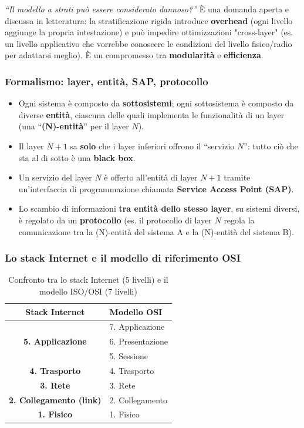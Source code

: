 \documentclass[12pt, a4paper]{article}
\begin{document}
\begin{tcolorbox}[colback=cyan!5, colframe=blue!40!black, title=\textbf{Spunto per l'orale}]
\textit{``Il modello a strati può essere considerato dannoso?''} È una domanda aperta e discussa in letteratura: la stratificazione rigida introduce \textbf{overhead} (ogni livello aggiunge la propria intestazione) e può impedire ottimizzazioni "cross-layer" (es. un livello applicativo che vorrebbe conoscere le condizioni del livello fisico/radio per adattarsi meglio). È un compromesso tra \textbf{modularità} e \textbf{efficienza}.
\end{tcolorbox}

\subsubsection{Formalismo: layer, entità, SAP, protocollo}

\begin{itemize}
    \item Ogni sistema è composto da \textbf{sottosistemi}; ogni sottosistema è composto da diverse \textbf{entità}, ciascuna delle quali implementa le funzionalità di un layer (una ``\textbf{(N)-entità}'' per il layer $N$).
    \item Il layer $N+1$ sa \textbf{solo} che i layer inferiori offrono il ``servizio $N$'': tutto ciò che sta al di sotto è una \textbf{black box}.
    \item Un servizio del layer $N$ è offerto all'entità di layer $N{+}1$ tramite un'interfaccia di programmazione chiamata \textbf{Service Access Point (SAP)}.
    \item Lo scambio di informazioni \textbf{tra entità dello stesso layer}, su sistemi diversi, è regolato da un \textbf{protocollo} (es. il protocollo di layer $N$ regola la comunicazione tra la (N)-entità del sistema A e la (N)-entità del sistema B).
\end{itemize}

\subsubsection{Lo stack Internet e il modello di riferimento OSI}

\begin{table}[H]
\centering
\caption{Confronto tra lo stack Internet (5 livelli) e il modello ISO/OSI (7 livelli)}
\begin{tabular}{cl}
\toprule
\textbf{Stack Internet} & \textbf{Modello OSI} \\
\midrule
 & 7. Applicazione \\
\textbf{5. Applicazione} & 6. Presentazione \\
 & 5. Sessione \\
\textbf{4. Trasporto} & 4. Trasporto \\
\textbf{3. Rete} & 3. Rete \\
\textbf{2. Collegamento (link)} & 2. Collegamento \\
\textbf{1. Fisico} & 1. Fisico \\
\bottomrule
\end{tabular}
\end{table}
\end{document}
